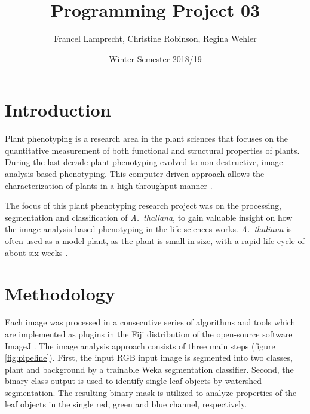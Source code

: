 \documentclass[paper=A4,bibliography=totocnumbered]{scrartcl}
\title{Programming Project 03}
\author{Francel Lamprecht, Christine Robinson, Regina Wehler}
\date{Winter Semester 2018/19}
\begin{document}
\maketitle

\tableofcontents
\clearpage
\section{Introduction}
Plant phenotyping is a research  area in the plant sciences that focuses on the quantitative measurement of both functional and structural properties of plants. During the last decade plant phenotyping evolved to non-destructive, image-analysis-based phenotyping. This computer driven approach allows the characterization of plants in a high-throughput manner \citep{Walter.2015}.

The focus of this plant phenotyping research project was on the processing, segmentation and classification of \textit{A.~thaliana}, to gain valuable insight on how the image-analysis-based phenotyping in the life sciences works. \textit{A.~thaliana} is often used as a model plant, as the plant is small in size, with a rapid life cycle of about six weeks \citep{Koornneef.2010}. 

\section{Methodology}
Each image was processed in a consecutive series of algorithms and tools which are implemented as plugins in the Fiji distribution \citep{Schindelin.2012} of the open-source software ImageJ \citep{Rueden.2017}. The image analysis approach consists of three main steps (figure \ref{fig:pipeline}). First, the input RGB input image is segmented into two classes, plant and background by a trainable Weka segmentation classifier. Second, the binary class output is used to identify single leaf objects by watershed segmentation. The resulting binary mask is utilized to analyze properties of the leaf objects in the single red, green and blue channel, respectively.
\end{document}
